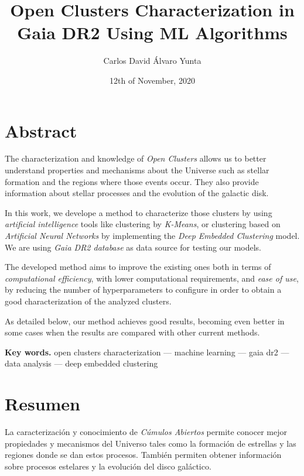 \documentclass[11pt, a4paper, english]{book}
\title{Open Clusters Characterization in Gaia DR2 Using ML Algorithms}
\author{Carlos David Álvaro Yunta}
\date{12th of November, 2020}
\begin{document}

\maketitle

\frontmatter
\tableofcontents

\chapter{Abstract}

The characterization and knowledge of \emph{Open Clusters} allows us to better understand properties and mechanisms about the Universe
such as stellar formation and the regions where those events occur. They also provide information about stellar processes and the
evolution of the galactic disk.

In this work, we develope a method to characterize those clusters by using \emph{artificial intelligence} tools like clustering
by \emph{K-Means}, or clustering based on \emph{Artificial Neural Networks} by implementing the \emph{Deep Embedded Clustering}
model. We are using \emph{Gaia DR2 database} as data source for testing our models.

The developed method aims to improve the existing ones both in terms of \emph{computational efficiency}, with lower computational requirements,
and \emph{ease of use}, by reducing the number of hyperparameters to configure in order to obtain a good characterization of the analyzed clusters.

As detailed below, our method achieves good results, becoming even better in some cases when the results are compared with other current methods.

\medskip

{\bf Key words.} open clusters characterization --- machine learning --- gaia dr2 --- data analysis --- deep embedded clustering

\chapter{Resumen}

La caracterización y conocimiento de \emph{Cúmulos Abiertos} permite conocer mejor propiedades y mecanismos del Universo tales como
la formación de estrellas y las regiones donde se dan estos procesos. También permiten obtener información sobre procesos estelares
y la evolución del disco galáctico.
\end{document}
